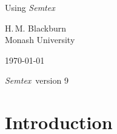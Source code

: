 \documentclass[11pt]{report}
\newcommand{\Semtex}{\emph{Semtex}} \newcommand{\Dog}{\emph{Dog}}
\begin{document}
\begin{titlepage}
\centering

\vspace*{\fill}

{\huge Using \Semtex}

\vspace{\fill}

\begin{figure}[h]
\begin{center}
\end{center}
\end{figure}

\vspace{\fill}

{\large H.\,M. Blackburn}\\
Monash University

\vspace{\fill}

\today

\Semtex\ version 9

\vspace*{\fill}

\end{titlepage}


\tableofcontents

\clearpage

\chapter{Introduction}
\end{document}
